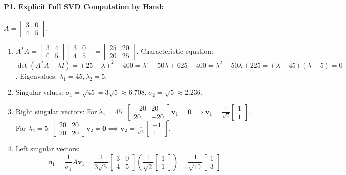 \paragraph{P1. Explicit Full SVD Computation by Hand:}
$A = \begin{bmatrix} 3 & 0 \\ 4 & 5 \end{bmatrix}$.
\begin{enumerate}[label=(\alph*)]
    \item $A^T A = \begin{bmatrix} 3 & 4 \\ 0 & 5 \end{bmatrix} \begin{bmatrix} 3 & 0 \\ 4 & 5 \end{bmatrix} = \begin{bmatrix} 25 & 20 \\ 20 & 25 \end{bmatrix}$.
    Characteristic equation: $\det(A^T A - \lambda I) = (25 - \lambda)^2 - 400 = \lambda^2 - 50\lambda + 625 - 400 = \lambda^2 - 50\lambda + 225 = (\lambda - 45)(\lambda - 5) = 0$.
    Eigenvalues: $\lambda_1 = 45, \lambda_2 = 5$.
    \item Singular values: $\sigma_1 = \sqrt{45} = 3\sqrt{5} \approx 6.708$, $\sigma_2 = \sqrt{5} \approx 2.236$.
    \item Right singular vectors:
    For $\lambda_1 = 45$: $\begin{bmatrix} -20 & 20 \\ 20 & -20 \end{bmatrix}\mathbf{v}_1 = \mathbf{0} \implies \mathbf{v}_1 = \frac{1}{\sqrt{2}}\begin{bmatrix} 1 \\ 1 \end{bmatrix}$.
    For $\lambda_2 = 5$: $\begin{bmatrix} 20 & 20 \\ 20 & 20 \end{bmatrix}\mathbf{v}_2 = \mathbf{0} \implies \mathbf{v}_2 = \frac{1}{\sqrt{2}}\begin{bmatrix} -1 \\ 1 \end{bmatrix}$.
    \item Left singular vectors:
    \[
    \mathbf{u}_1 = \frac{1}{\sigma_1} A \mathbf{v}_1 = \frac{1}{3\sqrt{5}} \begin{bmatrix} 3 & 0 \\ 4 & 5 \end{bmatrix} \left( \frac{1}{\sqrt{2}}\begin{bmatrix} 1 \\ 1 \end{bmatrix} \right) = \frac{1}{\sqrt{10}} \begin{bmatrix} 1 \\ 3 \end{bmatrix}
\]
\end{enumerate}
